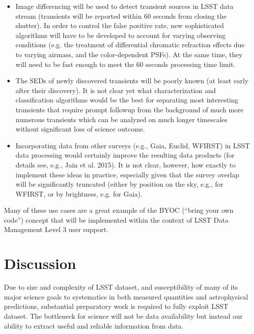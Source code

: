 \documentclass{iau}
\begin{document}
\begin{itemize}
  (PSF) will depend on time, instrument state, source position, and
  source color (more precisely, on in-band SED shape) , see Meyers \&
  Burchat (2015). Robust and precise determination of the PSF will
  therefore be a rather non-trivial undertaking.
\item Image differencing will be used to detect transient sources in
  LSST data stream (transients will be reported within 60 seconds from
  closing the shutter). In order to control the false positive rate,
  new sophisticated algorithms will have to be developed to account
  for varying observing conditions (e.g. the treatment of differential
  chromatic refraction effects due to varying airmass, and the
  color-dependent PSFs). At the same time, they will need to be fast
  enough to meet the 60 seconds processing time limit.
\item The SEDs of newly discovered transients will be poorly known (at least early after their discovery).
It is not clear yet what characterization and classification algorithms would be the best for separating 
most interesting transients that require prompt followup from the background of much more numerous
transients which can be analyzed on much longer timescales without significant loss of science outcome.
\item Incorporating data from other surveys (e.g., Gaia, Euclid, WFIRST) in LSST data processing would
certainly improve the resulting data products (for details see, e.g., Jain et al. 2015). It is not clear, however,
how exactly to implement these ideas in practice, especially given that the survey overlap will be 
significantly truncated (either by position on the sky, e.g., for WFIRST, or by brightness, e.g. for Gaia). 
\end{itemize}

Many of these use cases are a great example of the BYOC (``bring your own code'') concept 
that will be implemented within the context of LSST Data Management Level 3 user support. 



\section{Discussion}

Due to size and complexity of LSST dataset, and susceptibility of many
of its major science goals to systematics in both measured quantities
and astrophysical predictions, substantial preparatory work is
required to fully exploit LSST dataset. The bottleneck for science
will not be data availability but instead our ability to extract
useful and reliable information from data.
\end{document}
